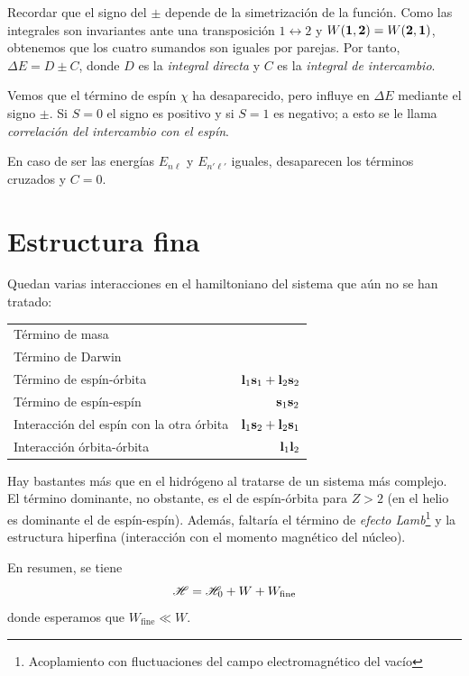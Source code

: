 Recordar que el signo del $\pm$ depende de la simetrización de la
función. Como las integrales son invariantes ante una transposición $1
\leftrightarrow 2$ y $W(\bm{\mathrm{1}},\bm{\mathrm{2}}) =
W(\bm{\mathrm{2}},\bm{\mathrm{1}})$, obtenemos que los cuatro sumandos son
iguales por parejas. Por tanto, $\Delta E = D \pm C$, donde $D$ es la
\emph{integral directa} y $C$ es la \emph{integral de intercambio}.

Vemos que el término de espín $\chi$ ha desaparecido, pero influye en $\Delta
E$ mediante el signo $\pm$. Si $S=0$ el signo es positivo y si $S=1$
es negativo\footnotemark; a esto se le llama \emph{correlación del intercambio con
el espín}.


En caso de ser las energías $E_{n\ell}$ y $E_{n'\ell'}$ iguales,
desaparecen los términos cruzados y $C=0$.

\section{Estructura fina}
Quedan varias interacciones en el hamiltoniano del sistema que aún no
se han tratado:
\begin{center}
  \begin{tabular}{lr}
     Término de masa& \\
     Término de Darwin& \\
    Término de
    espín-órbita&
                  $\bm{\mathrm{l}}_1\bm{\mathrm{s}}_1 + \bm{\mathrm{l}}_2 \bm{\mathrm{s}}_2$ \\
    Término de
    espín-espín&
                 $\bm{\mathrm{s}}_1 \bm{\mathrm{s}}_2$ \\
      Interacción del espín con
      la otra órbita  &
    $\bm{\mathrm{l}}_1\bm{\mathrm{s}}_2 + \bm{\mathrm{l}}_2 \bm{\mathrm{s}}_1$ \\
    Interacción
    órbita-órbita &
                   $\bm{\mathrm{l}}_1\bm{\mathrm{l}}_2$ \\
  \end{tabular}
\end{center}

Hay bastantes más que en el hidrógeno al tratarse de un sistema más
complejo. El término dominante, no obstante, es el de espín-órbita
para $Z>2$ (en el helio es dominante el de espín-espín). Además,
faltaría el término de \emph{efecto Lamb}\footnote{Acoplamiento con
  fluctuaciones del campo electromagnético del vacío} y la estructura
hiperfina (interacción con el momento magnético del núcleo).

En resumen, se tiene
\begin{equation}
  \mathscr{H} = \mathscr{H}_0 + W + W_\text{fine}
\end{equation}
donde esperamos que $W_\text{fine} \ll W$.


